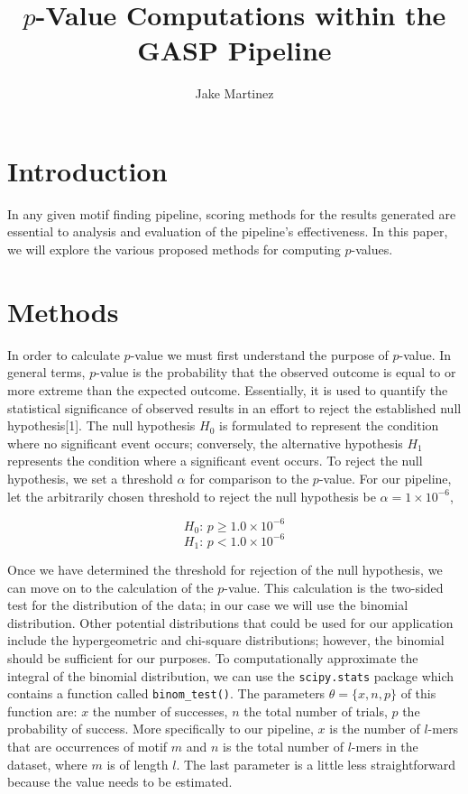 \documentclass[12pt]{article}
\title{$p$-Value Computations within the GASP Pipeline}
\author{Jake Martinez}
\begin{document}
\maketitle

\section{Introduction}
In any given motif finding pipeline, scoring methods for the results generated are essential to
analysis and evaluation of the pipeline's effectiveness. In this paper, we will explore the
various proposed methods for computing $p$-values.


\section{Methods}
In order to calculate $p$-value we must first understand the purpose of $p$-value. In general terms,
$p$-value is the probability that the observed outcome is equal to or more extreme than the expected
outcome. Essentially, it is used to quantify the statistical significance of observed results in an
effort to reject the established null hypothesis[1]. The null hypothesis $H_0$ is formulated to 
represent the condition where no significant event occurs; conversely, the alternative hypothesis 
$H_1$ represents the condition where a significant event occurs. To reject the null hypothesis, we 
set a threshold $\alpha$ for comparison to the $p$-value. For our pipeline, let the arbitrarily chosen 
threshold to reject the null hypothesis be $\alpha = 1\times10^{-6}$,

$$ H_0\textrm{: }p \geq 1.0\times10^{-6} $$
$$ H_1\textrm{: }p < 1.0\times10^{-6} $$

Once we have determined the threshold for rejection of the null hypothesis, we can move on to the
calculation of the $p$-value. This calculation is the two-sided test for the distribution of the
data; in our case we will use the binomial distribution. Other potential distributions that could be
used for our application include the hypergeometric and chi-square distributions; however, the binomial
should be sufficient for our purposes. To computationally approximate the integral of the binomial 
distribution, we can use the \texttt{scipy.stats} package which contains a function called 
\texttt{binom\_test()}. The parameters $\theta = \{x,n,p\}$ of this function are: $x$ the number of 
successes, $n$ the total number of trials, $p$ the probability of success. More specifically to our 
pipeline, $x$ is the number of $l$-mers that are occurrences of motif $m$ and $n$ is the total number 
of $l$-mers in the dataset, where $m$ is of length $l$. The last parameter is a little less 
straightforward because the value needs to be estimated.
\end{document}
